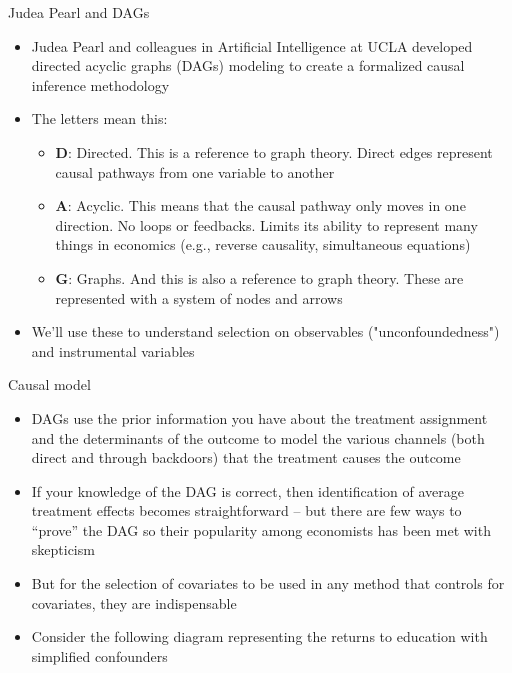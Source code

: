 \begin{frame}{Judea Pearl and DAGs}


  \begin{itemize}
    \item Judea Pearl and colleagues in Artificial Intelligence at UCLA developed directed acyclic graphs (DAGs) modeling to create a formalized causal inference methodology
    \item The letters mean this:
    	\begin{itemize}
	\item \textbf{D}: Directed.  This is a reference to graph theory.  Direct edges represent causal pathways from one variable to another
	\item \textbf{A}: Acyclic.  This means that the causal pathway only moves in one direction.  No loops or feedbacks. Limits its ability to represent many things in economics (e.g., reverse causality, simultaneous equations)
	\item \textbf{G}: Graphs. And this is also a reference to graph theory.  These are represented with a system of nodes and arrows
	\end{itemize}
    \item We'll use these to understand selection on observables ("unconfoundedness") and instrumental variables
  \end{itemize}

\end{frame}






\begin{frame}{Causal model}

  \begin{itemize}
  \item DAGs use the prior information you have about the treatment assignment and the determinants of the outcome to model the various channels (both direct and through backdoors) that the treatment causes the outcome
	\item If your knowledge of the DAG is correct, then identification of average treatment effects becomes straightforward -- but there are few ways to ``prove'' the DAG so their popularity among economists has been met with skepticism
	\item But for the selection of covariates to be used in any method that controls for covariates, they are indispensable 
    \item Consider the following diagram representing the returns to education with simplified confounders
  \end{itemize}

\end{frame}


